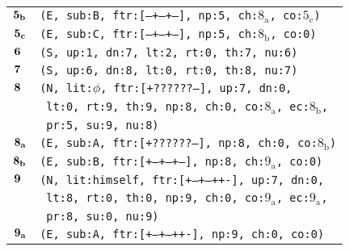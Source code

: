 \documentclass{article}
\begin{document}
\begin{minipage}{\textwidth}
{\begin{tabular}{|r|l|}
    ${\textbf{\textrm{5}}_{\textbf{\textrm{b}}}}$ & \texttt{\texttt{(E,~sub:B,~ftr:[---+--+--],~np:5,~ch:${\textrm{8}_{\textrm{a}}}$,~co:${\textrm{5}_{\textrm{c}}}$)}} \\
    ${\textbf{\textrm{5}}_{\textbf{\textrm{c}}}}$ & \texttt{\texttt{(E,~sub:C,~ftr:[---+--+--],~np:5,~ch:${\textrm{8}_{\textrm{b}}}$,~co:0)}} \\
    ${\textbf{\textrm{6}}_{\phantom{z}}}$ & \texttt{\texttt{(S,~up:1,~dn:7,~lt:2,~rt:0,~th:7,~nu:6)}} \\
    ${\textbf{\textrm{7}}_{\phantom{z}}}$ & \texttt{\texttt{(S,~up:6,~dn:8,~lt:0,~rt:0,~th:8,~nu:7)}} \\
    ${\textbf{\textrm{8}}_{\phantom{z}}}$ & \texttt{\texttt{(N,~lit:$\phi$,~ftr:[+??????--],~up:7,~dn:0,}} \\
    & \texttt{\texttt{~lt:0,~rt:9,~th:9,~np:8,~ch:0,~co:${\textrm{8}_{\textrm{a}}}$,~ec:${\textrm{8}_{\textrm{b}}}$,}} \\
    & \texttt{\texttt{~pr:5,~su:9,~nu:8)}} \\
    ${\textbf{\textrm{8}}_{\textbf{\textrm{a}}}}$ & \texttt{\texttt{(E,~sub:A,~ftr:[+??????--],~np:8,~ch:0,~co:${\textrm{8}_{\textrm{b}}}$)}} \\
    ${\textbf{\textrm{8}}_{\textbf{\textrm{b}}}}$ & \texttt{\texttt{(E,~sub:B,~ftr:[+--+--+--],~np:8,~ch:${\textrm{9}_{\textrm{a}}}$,~co:0)}} \\
    ${\textbf{\textrm{9}}_{\phantom{z}}}$ & \texttt{\texttt{(N,~lit:himself,~ftr:[+--+--++-],~up:7,~dn:0,}} \\
    & \texttt{\texttt{~lt:8,~rt:0,~th:0,~np:9,~ch:0,~co:${\textrm{9}_{\textrm{a}}}$,~ec:${\textrm{9}_{\textrm{a}}}$,}} \\
    & \texttt{\texttt{~pr:8,~su:0,~nu:9)}} \\
    ${\textbf{\textrm{9}}_{\textbf{\textrm{a}}}}$ & \texttt{\texttt{(E,~sub:A,~ftr:[+--+--++-],~np:9,~ch:0,~co:0)}} \\
    \hline
  \end{tabular}
  }
\end{minipage}
\bigbreak
\end{document}

